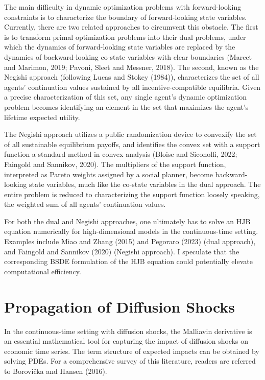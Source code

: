 \documentclass{article}
\begin{document}
The main difficulty in dynamic optimization problems with forward-looking constraints is to characterize the boundary of forward-looking state variables. Currently, there are two related approaches to circumvent this obstacle. The first is to transform primal optimization problems into their dual problems, under which the dynamics of forward-looking state variables are replaced by the dynamics of backward-looking co-state variables with clear boundaries (Marcet and Marimon, 2019; Pavoni, Sleet and Messner, 2018). The second, known as the Negishi approach (following Lucas and Stokey (1984)), characterizes the set of all agents' continuation values sustained by all incentive-compatible equilibria. Given a precise characterization of this set, any single agent's dynamic optimization problem becomes identifying an element in the set that maximizes the agent's lifetime expected utility.

The Negishi approach utilizes a public randomization device to convexify the set of all sustainable equilibrium payoffs, and identifies the convex set with a support function a standard method in convex analysis (Bloise and Siconolfi, 2022; Faingold and Sannikov, 2020). The multipliers of the support function, interpreted as Pareto weights assigned by a social planner, become backward-looking state variables, much like the co-state variables in the dual approach. The entire problem is reduced to characterizing the support function loosely speaking, the weighted sum of all agents' continuation values.

For both the dual and Negishi approaches, one ultimately has to solve an HJB equation numerically for high-dimensional models in the continuous-time setting. Examples include Miao and Zhang (2015) and Pegoraro (2023) (dual approach), and Faingold and Sannikov (2020) (Negishi approach). I speculate that the corresponding BSDE formulation of the HJB equation could potentially elevate computational efficiency.

\section{Propagation of Diffusion Shocks}

In the continuous-time setting with diffusion shocks, the Malliavin derivative is an essential mathematical tool for capturing the impact of diffusion shocks on economic time series. The term structure of expected impacts can be obtained by solving PDEs. For a comprehensive survey of this literature, readers are referred to Borovička and Hansen (2016).
\end{document}
